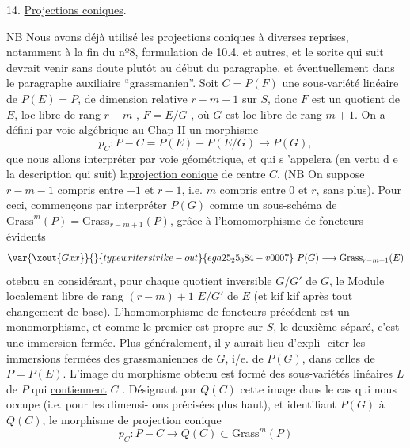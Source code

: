 
14. \uline{Projections coniques}.

NB Nous avons déjà utilisé les projections coniques à diverses
reprises, notamment à la fin du nº8, formulation de 10.4. et autres, et
le sorite qui suit devrait venir sans doute plutôt au début du paragraphe,
et éventuellement dans le paragraphe auxiliaire ``grassmanien''.
Soit $C = P(F)$ une sous-variété linéaire de $P(E)=P$, de dimension
relative $r-m-1$  sur $S$, donc $F$ est un quotient de $E$, loc libre de
rang $r-m$ , $F=E/G$ , où $G$ est loc libre de rang $m+1$. On a défini
par voie algébrique au Chap II un morphisme
\[ p_C : P - C = P(E) - P(E/G) \longrightarrow P(G) , \]
que nous allons interpréter par voie géométrique, et qui s 'appelera
(en vertu d e la description qui suit) la\uline{projection conique} de centre $C$.
(NB On suppose $r-m-1$ compris entre $-1$ et $r-1$, i.e. $m$ compris entre $0$
et $r$, sans plus). Pour ceci, commençons par interpréter  $P(G)$
comme un sous-schéma de $\mathrm{Grass}^m(P)= \mathrm{Grass}_{r-m+1}(P)$, grâce à l'homomorphisme
de foncteurs évidents
\[ \var{\xout{Gxx}}{}{typewriter strike-out}{ega25_25_084-v0007}\ P(G) \longrightarrow \mathrm{Grass}_{r-m+1}(E) \]
otebnu en considérant, pour chaque quotient inversible $G/G'$ de $G$, le
Module localement libre de rang $(r-m)+1$ $E/G'$ de $E$ (et kif kif après
tout changement de base). L'homomorphisme de foncteurs précédent est un
\uline{monomorphisme}, et comme le premier est propre sur $S$, le deuxième séparé,
c'est une immersion fermée. Plus généralement, il y aurait lieu d'expli-%
citer les immersions fermées des grassmaniennes de $G$, i/e. de $P(G)$,
dans celles de  $P=P(E)$.  L'image du morphisme obtenu est formé des
sous-variétés linéaires  $L$ de $P$ qui \uline{contiennent} $C$ . Désignant
par $Q(C)$ cette image dans le cas qui nous occupe (i.e. pour les dimensi-%
ons précisées plus haut), et identifiant $P(G)$ à $Q(C)$, le morphisme
de projection conique
\[ p_C : P - C \longrightarrow Q(C) \subset \mathrm{Grass}^m(P) \]

